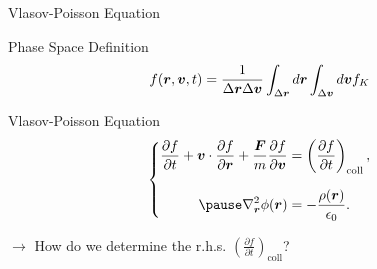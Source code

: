 \begin{frame}{Vlasov-Poisson Equation}

   \begin{block}{Phase Space Definition}
    \begin{equation}
        f(\boldsymbol{r}, \boldsymbol{v}, t) = \frac{1}{\Delta \boldsymbol{r} \Delta \boldsymbol{v}} \int_{\Delta \boldsymbol{r}} d\boldsymbol{r} \int_{\Delta
        \boldsymbol{v}} d\boldsymbol{v} f_K
        \label{eq:phaseSpaceDensity}
    \end{equation}
   \end{block}

   \pause
   \begin{block}{Vlasov-Poisson Equation}
       \begin{equation}
           \label{eq:VlasovPoissonEquation}
           \left\{  
               \begin{aligned}
                   \frac{\partial f}{\partial t} + \vect v \cdot \frac{\partial f}{\partial \vect r} +
                   \frac{\vect F}{m} \frac{\partial f}{\partial \vect v} &= \left( \frac{\partial f}{\partial t}
                   \right)_{\text{coll}}, \eqVspace
                   \pause
                       \posNabla^2 \phi(\vect r) &= - \frac{\rho(\vect r)}{\epsilon_0}.
                   \end{aligned}
               \right.
           \end{equation}
       \end{block}

       \pause

       \vspace{0.8mm}
       \begin{center}
               \large
           \item $\boldsymbol \rightarrow$ How do we determine the r.h.s. $\left( \frac{\partial f}{\partial t}
                   \right)_{\text{coll}}$?
       \end{center}
\end{frame}


